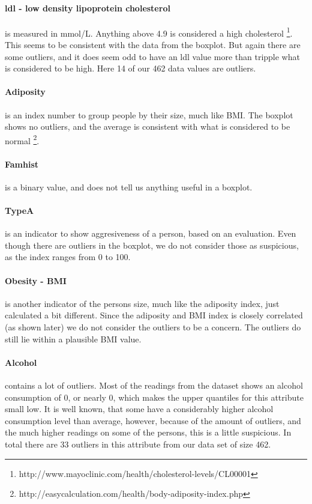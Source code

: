 \paragraph{ldl - low density lipoprotein cholesterol} is measured in mmol/L. Anything above 4.9 is considered a high cholesterol \footnote{http://www.mayoclinic.com/health/cholesterol-levels/CL00001}. This seems to be consistent with the data from the boxplot. But again there are some outliers, and it does seem odd to have an ldl value more than tripple what is considered to be high.
Here 14 of our 462 data values are outliers.%

\paragraph{Adiposity} is an index number to group people by their size, much like BMI. The boxplot shows no outliers, and the average is consistent with what is considered to be normal \footnote{http://easycalculation.com/health/body-adiposity-index.php}.

\paragraph{Famhist} is a binary value, and does not tell us anything useful in a boxplot.%

\paragraph{TypeA} is an indicator to show aggresiveness of a person, based on an evaluation. Even though there are outliers in the boxplot, we do not consider those as suspicious, as the index ranges from 0 to 100.

\paragraph{Obesity - BMI} is another indicator of the persons size, much like the adiposity index, just calculated a bit different. Since the adiposity and BMI index is closely correlated (as shown later) we do not consider the outliers to be a concern. The outliers do still lie within a plausible BMI value.

\paragraph{Alcohol} contains a lot of outliers. Most of the readings from the dataset shows an alcohol consumption of 0, or nearly 0, which makes the upper quantiles for this attribute small low. It is well known, that some have a considerably higher alcohol consumption level than average, however, because of the amount of outliers, and the much higher readings on some of the persons, this is a little suspicious.
In total there are 33 outliers in this attribute from our data set of size 462.

